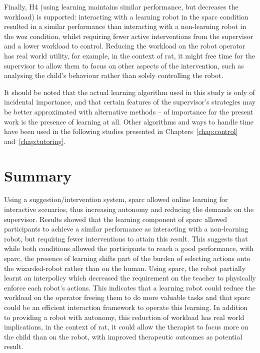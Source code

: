 Finally, H4 (using learning maintains similar performance, but decreases the workload) is supported: interacting with a learning robot in the \gls{sparc} condition resulted in a similar performance than interacting with a non-learning robot in the \gls{woz} condition, whilst requiring fewer active interventions from the supervisor and a lower workload to control. Reducing the workload on the robot operator has real world utility, for example, in the context of \gls{rat}, it might free time for the supervisor to allow them to focus on other aspects of the intervention, such as analysing the child's behaviour rather than solely controlling the robot. 

It should be noted that the actual learning algorithm used in this study is only of incidental importance, and that certain features of the supervisor's strategies may be better approximated with alternative methods -- of importance for the present work is the presence of learning at all. Other algorithms and ways to handle time have been used in the following studies presented in Chapters~\ref{chap:control} and~\ref{chap:tutoring}.

\section{Summary}

Using a suggestion/intervention system, \gls{sparc} allowed online learning for interactive scenarios, thus increasing autonomy and reducing the demands on the supervisor. Results showed that the learning component of \gls{sparc} allowed participants to achieve a similar performance as interacting with a non-learning robot, but requiring fewer interventions to attain this result. This suggests that while both conditions allowed the participants to reach a good performance, with \gls{sparc}, the presence of learning shifts part of the burden of selecting actions onto the wizarded-robot rather than on the human. Using \gls{sparc}, the robot partially learnt an interpolicy which decreased the requirement on the teacher to physically enforce each robot's actions. This indicates that a learning robot could reduce the workload on the operator freeing them to do more valuable tasks and that \gls{sparc} could be an efficient interaction framework to operate this learning. In addition to providing a robot with autonomy, this reduction of workload has real world implications, in the context of \gls{rat}, it could allow the therapist to focus more on the child than on the robot, with improved therapeutic outcomes as potential result. 

